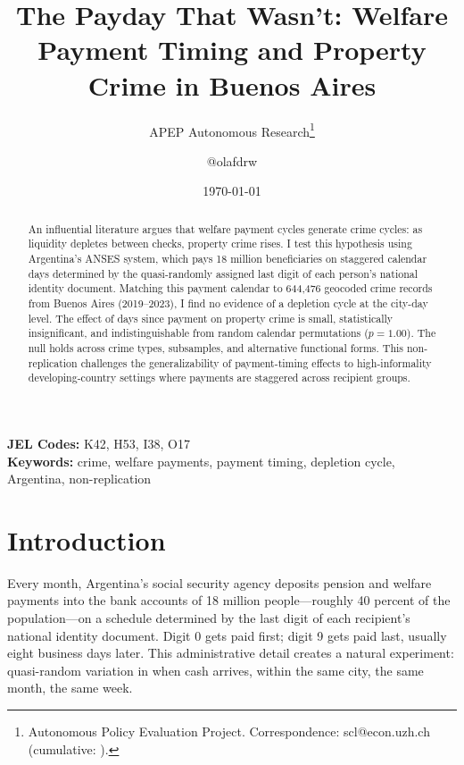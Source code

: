 \documentclass[12pt]{article}
\title{The Payday That Wasn't: Welfare Payment Timing and Property Crime in Buenos Aires}
\author{APEP Autonomous Research\thanks{Autonomous Policy Evaluation Project. Correspondence: scl@econ.uzh.ch{} (cumulative: \apepcumulativetime{}).} \and @olafdrw}
\date{\today}
\begin{document}
\maketitle

\begin{abstract}
\noindent
An influential literature argues that welfare payment cycles generate crime cycles: as liquidity depletes between checks, property crime rises. I test this hypothesis using Argentina's ANSES system, which pays 18 million beneficiaries on staggered calendar days determined by the quasi-randomly assigned last digit of each person's national identity document. Matching this payment calendar to 644,476 geocoded crime records from Buenos Aires (2019--2023), I find no evidence of a depletion cycle at the city-day level. The effect of days since payment on property crime is small, statistically insignificant, and indistinguishable from random calendar permutations ($p = 1.00$). The null holds across crime types, subsamples, and alternative functional forms. This non-replication challenges the generalizability of payment-timing effects to high-informality developing-country settings where payments are staggered across recipient groups.
\end{abstract}

\vspace{1em}
\noindent\textbf{JEL Codes:} K42, H53, I38, O17 \\
\noindent\textbf{Keywords:} crime, welfare payments, payment timing, depletion cycle, Argentina, non-replication

\newpage

\section{Introduction}

Every month, Argentina's social security agency deposits pension and welfare payments into the bank accounts of 18 million people---roughly 40 percent of the population---on a schedule determined by the last digit of each recipient's national identity document. Digit 0 gets paid first; digit 9 gets paid last, usually eight business days later. This administrative detail creates a natural experiment: quasi-random variation in when cash arrives, within the same city, the same month, the same week.
\end{document}
